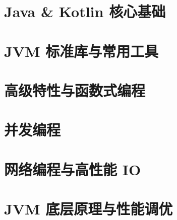 \documentclass{C:/Users/Violet/OneDrive/Notiz/ComputerScience/99-索引与模板/TexTemplate/computer-notes}
\begin{document}
\makecover
\tableofcontents
\newpage

\part{Java \& Kotlin 核心基础} %

\part{JVM 标准库与常用工具} %


\part{高级特性与函数式编程} %
\part{并发编程} %
\part{网络编程与高性能 IO} %
\part{JVM 底层原理与性能调优} %
% 
% 
% 
% 
\end{document}
